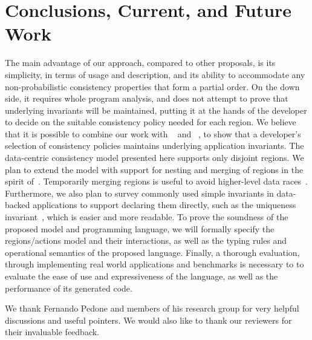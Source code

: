 \documentclass[numbers]{sigplanconf}
\begin{document}
\section{Conclusions, Current, and Future Work}
\label{sec:conclusion}
The main advantage of our approach, compared to other proposals, is its simplicity,
in terms of usage and description, and its ability to accommodate any
non-probabilistic consistency properties that form a partial order. On the down side, 
it requires whole program analysis, and does not attempt to prove that underlying 
invariants will be maintained, putting it at the hands of the developer to decide 
on the suitable consistency policy needed for each region. We believe that it is 
possible to combine our work with ~\cite{gotsman2016cause}
and ~\cite{balegas2015putting}, to show that a developer's selection of consistency
policies maintains underlying application invariants.
The data-centric consistency model presented here supports only 
disjoint regions. We plan to extend the model with support for nesting and merging 
of regions in the spirit of~\cite{dolby2012data}.
Temporarily merging regions is useful to avoid higher-level data races~\cite{artho2003high}.
Furthermore, we also plan to survey commonly used simple invariants in data-backed applications to support
declaring them directly, such as the uniqueness invariant~\cite{bailis2015feral},
which is easier  and more readable. To prove the soundness of the proposed model and 
programming language, we will formally specify the regions/actions model and their
interactions, as well as the typing rules and operational semantics of the
proposed language. Finally, a thorough evaluation, through implementing
real world applications and benchmarks is necessary to to evaluate the ease of use
and expressiveness of the language, as well as the performance of its generated
code.


\acks We thank Fernando Pedone and members of his research group
for very helpful discussions and useful pointers. We would also like to
thank our reviewers for their invaluable feedback.







\end{document}
